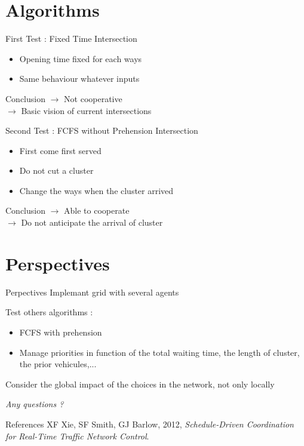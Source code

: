 \documentclass[]{beamer}
\begin{document}
\section{Algorithms}
\begin{frame}{First Test : Fixed Time Intersection}
 \begin{itemize}
  \item Opening time fixed for each ways
  \item Same behaviour whatever inputs
 \end{itemize}
 \begin{block}{Conclusion}
  $\rightarrow$ Not cooperative\\
  $\rightarrow$ Basic vision of current intersections
 \end{block}
\end{frame}

\begin{frame}{Second Test : FCFS without Prehension Intersection}
 \begin{itemize}
  \item First come first served
  \item Do not cut a cluster
  \item Change the ways when the cluster arrived
 \end{itemize}
 \begin{block}{Conclusion}
  $\rightarrow$ Able to cooperate\\
  $\rightarrow$ Do not anticipate the arrival of cluster
 \end{block}
\end{frame}

\section{Perspectives}
\begin{frame}{Perpectives}
Implemant grid with several agents\vspace{0.5cm}

Test others algorithms :
 \begin{itemize}
  \item FCFS with prehension
  \item Manage priorities in function of the total waiting time, the length of cluster, the prior vehicules,...
 \end{itemize}
 \vspace{0.5cm}
Consider the global impact of the choices in the network, not only locally
\end{frame}

\begin{frame}
\centering \LARGE
  \emph{Any questions ?}
\end{frame}

\begin{frame}{References}
XF Xie, SF Smith, GJ Barlow, 2012, \emph{Schedule-Driven Coordination for Real-Time Traffic Network Control}.
\end{frame}
\end{document}
